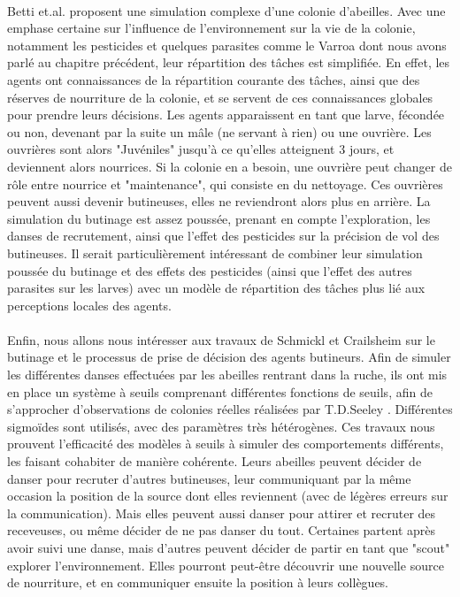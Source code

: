         \paragraph{}
        Betti et.al. \cite{betti_bee_2017} proposent une simulation complexe d'une colonie d'abeilles. Avec une emphase certaine sur l'influence de l'environnement sur la vie de la colonie, notamment les pesticides et quelques parasites comme le Varroa dont nous avons parlé au chapitre précédent, leur répartition des tâches est simplifiée. En effet, les agents ont connaissances de la répartition courante des tâches, ainsi que des réserves de nourriture de la colonie, et se servent de ces connaissances globales pour prendre leurs décisions.
         Les agents apparaissent en tant que larve, fécondée ou non, devenant par la suite un mâle (ne servant à rien) ou une ouvrière. Les ouvrières sont alors "Juvéniles" jusqu'à ce qu'elles atteignent 3 jours, et deviennent alors nourrices. Si la colonie en a besoin, une ouvrière peut changer de rôle entre nourrice et "maintenance", qui consiste en du nettoyage. Ces ouvrières peuvent aussi devenir butineuses, elles ne reviendront alors plus en arrière.
         La simulation du butinage est assez poussée, prenant en compte l'exploration, les danses de recrutement, ainsi que l'effet des pesticides sur la précision de vol des butineuses. Il serait particulièrement intéressant de combiner leur simulation poussée du butinage et des effets des pesticides (ainsi que l'effet des autres parasites sur les larves) avec un modèle de répartition des tâches plus lié aux perceptions locales des agents.
        
        \paragraph{}
        Enfin, nous allons nous intéresser aux travaux de Schmickl et Crailsheim \cite{schmickl_costs_2004} sur le butinage et le processus de prise de décision des agents butineurs. Afin de simuler les différentes danses effectuées par les abeilles rentrant dans la ruche, ils ont mis en place un système à seuils comprenant différentes fonctions de seuils, afin de s'approcher d'observations de colonies réelles réalisées par T.D.Seeley \cite{seeley_tremble_1992}. Différentes sigmoïdes sont utilisés, avec des paramètres très hétérogènes. Ces travaux nous prouvent l'efficacité des modèles à seuils à simuler des comportements différents, les faisant cohabiter de manière cohérente. Leurs abeilles peuvent décider de danser pour recruter d'autres butineuses, leur communiquant par la même occasion la position de la source dont elles reviennent (avec de légères erreurs sur la communication). Mais elles peuvent aussi danser pour attirer et recruter des receveuses, ou même décider de ne pas danser du tout. Certaines partent après avoir suivi une danse, mais d'autres peuvent décider de partir en tant que "scout" explorer l'environnement. Elles pourront peut-être découvrir une nouvelle source de nourriture, et en communiquer ensuite la position à leurs collègues.
        
